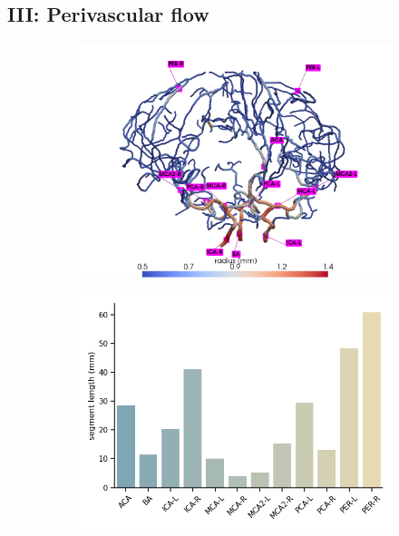 \documentclass[fleqn,10pt]{wlscirep}
\newcommand{\draft}[1]{\textcolor{gray}{#1}}
\begin{document}
\subsection*{III: Perivascular flow}

\draft{\lipsum[1]}

\begin{figure}
    \centering
    \begin{subfigure}[b]{0.65\textwidth}
    \centering
    \includegraphics[width = \linewidth]{figures/labeled_arteries.png}
    \end{subfigure}
     \begin{subfigure}[b]{0.3\textwidth}
    \centering
    \includegraphics[width =  \linewidth]{figures/vasomotion_arteries_labels_length.png}

\end{subfigure}
\end{figure}
\end{document}
